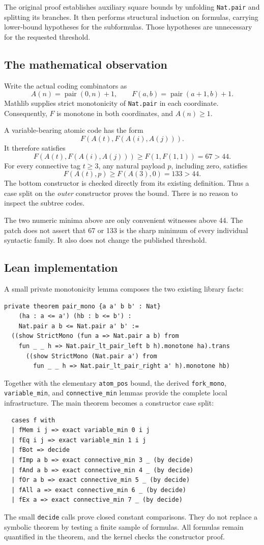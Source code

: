 \documentclass[11pt,letterpaper]{article}
\newcommand{\code}[1]{\nolinkurl{#1}}
\begin{document}
The original proof establishes auxiliary square bounds by unfolding \code{Nat.pair} and splitting its branches. It then performs structural induction on formulas, carrying lower-bound hypotheses for the subformulas. Those hypotheses are unnecessary for the requested threshold.

\subsection{The mathematical observation}
Write the actual coding combinators as
\[
 A(n)=\operatorname{pair}(0,n)+1,\qquad
 F(a,b)=\operatorname{pair}(a+1,b)+1.
\]
Mathlib supplies strict monotonicity of \code{Nat.pair} in each coordinate. Consequently, \(F\) is monotone in both coordinates, and \(A(n)\geq1\).

A variable-bearing atomic code has the form
\[
 F(A(t),F(A(i),A(j))).
\]
It therefore satisfies
\[
 F(A(t),F(A(i),A(j)))\geq F(1,F(1,1))=67>44.
\]
For every connective tag \(t\geq3\), any natural payload \(p\), including zero, satisfies
\[
 F(A(t),p)\geq F(A(3),0)=133>44.
\]
The bottom constructor is checked directly from its existing definition. Thus a case split on the \emph{outer} constructor proves the bound. There is no reason to inspect the subtree codes.

The two numeric minima above are only convenient witnesses above 44. The patch does not assert that 67 or 133 is the sharp minimum of every individual syntactic family. It also does not change the published threshold.

\subsection{Lean implementation}
A small private monotonicity lemma composes the two existing library facts:
\begin{lstlisting}
private theorem pair_mono {a a' b b' : Nat}
    (ha : a <= a') (hb : b <= b') :
    Nat.pair a b <= Nat.pair a' b' :=
  ((show StrictMono (fun a => Nat.pair a b) from
    fun _ _ h => Nat.pair_lt_pair_left b h).monotone ha).trans
      ((show StrictMono (Nat.pair a') from
        fun _ _ h => Nat.pair_lt_pair_right a' h).monotone hb)
\end{lstlisting}
Together with the elementary \code{atom_pos} bound, the derived \code{fork_mono}, \code{variable_min}, and \code{connective_min} lemmas provide the complete local infrastructure. The main theorem becomes a constructor case split:
\begin{lstlisting}
  cases f with
  | fMem i j => exact variable_min 0 i j
  | fEq i j => exact variable_min 1 i j
  | fBot => decide
  | fImp a b => exact connective_min 3 _ (by decide)
  | fAnd a b => exact connective_min 4 _ (by decide)
  | fOr a b => exact connective_min 5 _ (by decide)
  | fAll a => exact connective_min 6 _ (by decide)
  | fEx a => exact connective_min 7 _ (by decide)
\end{lstlisting}
The small \code{decide} calls prove closed constant comparisons. They do not replace a symbolic theorem by testing a finite sample of formulas. All formulas remain quantified in the theorem, and the kernel checks the constructor proof.
\end{document}
